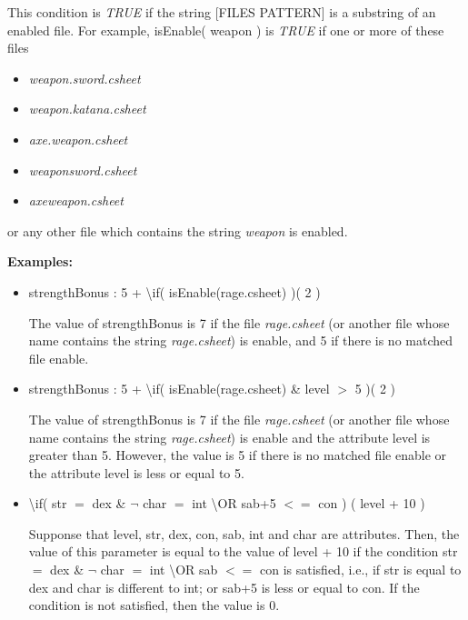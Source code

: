 \documentclass[11pt,a4paper,openright,oneside]{book}
\newenvironment{exs}
{
  \setlength{\parindent}{0cm}
  \large \textbf{Examples:} \normalsize
}
{}
\begin{document}
This condition is \textit{TRUE} if the string \textsc{\scriptsize[FILES PATTERN]} is a substring of an enabled file. For example, \textsf{isEnable( weapon )} is \textit{TRUE} if one or more of these files
\begin{itemize}
  \item \textit{weapon.sword.csheet}
  \item \textit{weapon.katana.csheet}
  \item \textit{axe.weapon.csheet}
  \item \textit{weaponsword.csheet}
  \item \textit{axeweapon.csheet}
\end{itemize}
or any other file which contains the string \textit{weapon} is enabled.

\begin{exs}
  \begin{itemize}
    \item \textsf{strengthBonus : 5 + \textbackslash if( isEnable(rage.csheet) )( 2 )}

    The value of \textsf{strengthBonus} is \textsf{7} if the file \textit{rage.csheet} (or another file whose name contains the string \textit{rage.csheet}) is enable, and \textsf{5} if there is no matched file enable.

    \item \textsf{strengthBonus : 5 + \textbackslash if( isEnable(rage.csheet) \& level $>$ 5 )( 2 )}

    The value of \textsf{strengthBonus} is \textsf{7} if the file \textit{rage.csheet} (or another file whose name contains the string \textit{rage.csheet}) is enable and the attribute \textsf{level} is greater than \textsf{5}. However, the value is \textsf{5} if there is no matched file enable or the attribute \textsf{level} is less or equal to \textsf{5}.

    \item \textsf{\textbackslash if( str $=$ dex \& $\neg$ char $=$ int \textbackslash OR  sab+5 $<=$ con ) ( level + 10 )}
    
    Supponse that \textsf{level, str, dex, con, sab, int} and \textsf{char} are attributes. Then, the value of this parameter is equal to the value of \textsf{level + 10} if the condition \textsf{str $=$ dex \& $\neg$ char $=$ int \textbackslash OR  sab $<=$ con} is satisfied, i.e., if \textsf{str} is equal to \textsf{dex} and \textsf{char} is different to \textsf{int}; or \textsf{sab+5} is less or equal to \textsf{con}. If the condition is not satisfied, then the value is \textsf{0}.
  \end{itemize}
\end{exs}
\end{document}

